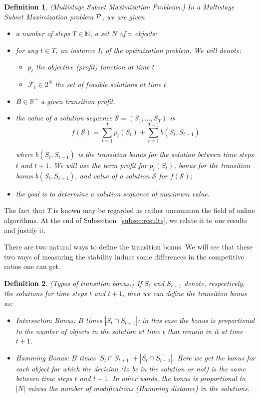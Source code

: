 \documentclass[a4paper]{book}
\newtheorem{definition}{Definition}
\newcommand{\finalversion}[1]{#1}
\begin{document}
\begin{definition}
\emph{(Multistage Subset Maximization Problems.)} In a Multistage Subset Maximization problem $\cal P$, we are given
\begin{itemize}
\item a number of steps $T \in \mathbb{N}$, a set $N$ of $n$ objects;
\item for any $t \in T$, an instance $I_t$ of the optimization problem. We will denote:
\begin{itemize}
\item $p_{t}$ the objective (profit) function at time $t$
\item $\mathcal{F}_t\in 2^N$ the set of feasible solutions at time $t$
\end{itemize} 
\item $B \in \mathbb{R^{+}}$ a given transition profit. 
\item the value of a solution sequence $\mathcal{S}=(S_1,\dots,S_T)$ is %
\[f(\mathcal{S})=\sum_{t=1}^T p_t(S_t) + \sum_{t=1}^{T-1} b(S_t,S_{t+1})\]


where $b(S_t,S_{t+1})$ is the transition bonus for the solution between time steps $t$ and $t+1$. We will use the term {\it profit} for $ p_t(S_t)$, {\it bonus} for the transition bonus $b(S_t,S_{t+1})$, and {\it value} of a solution $\mathcal{S}$ for $f(\mathcal{S})$;
\item the goal is to determine a solution sequence of maximum value. 
\end{itemize}
\end{definition}

\finalversion{The fact that $T$ is known may be regarded as rather uncommon the field of online algorithms. At the end of Subsection~\ref{subsec:results}, we relate it to our results and justify it.}

 There are two natural ways to define the transition bonus. We will see that these two ways of measuring the stability induce some differences in the competitive ratios one can get. 

\begin{definition}
\emph{(Types of transition bonus.)}
 If $S_t$ and $S_{t+1}$ denote, respectively, the solutions for time steps $t$ and $t+1$, then we can define the transition bonus as:
\begin{itemize}
    \item \emph{Intersection Bonus:}  $B$ times $|S_{t}\cap S_{t+1}|$: in this case the bonus is proportional to the number of objects in the solution at time $t$ that remain in it at time $t+1$.
    \item \emph{Hamming Bonus:} $B$ times $|S_{t}\cap S_{t+1}|+|\overline{S_{t}}\cap \overline{S_{t+1}}|$. Here we get the bonus for each object for which the decision (to be in the solution or not) is the same between time steps $t$ and $t+1$. In other words, the bonus is proportional to $|N|$ minus the number of modifications (Hamming distance) in the solutions.
\end{itemize}
\end{definition}
\end{document}
